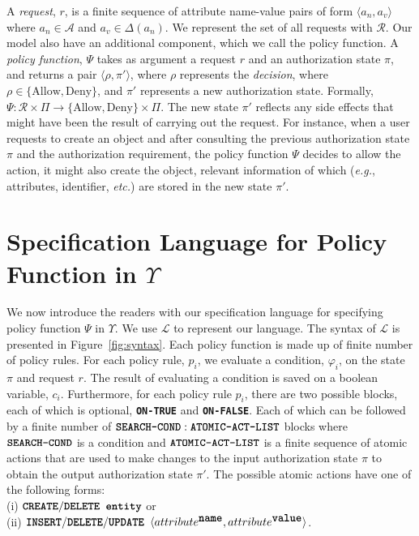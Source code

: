 \documentclass{sig-alternate}
\newcommand{\eg}{\textit{e.g.}\xspace}
\newcommand{\etc}{\textit{etc.}\xspace}
\newcommand{\state}{\ensuremath{\pi}\xspace}
\newcommand{\stateset}{\ensuremath{\Pi}\xspace}
\newcommand{\policyfunc}{\ensuremath{\Psi}\xspace}
\newcommand{\cR}{\ensuremath{\mathcal{R}}\xspace}
\newcommand{\cA}{\ensuremath{\mathcal{A}}\xspace}
\newcommand{\funcname}[1]{\textbf{\texttt{#1}}}
\newcommand{\dom}{\ensuremath{\Delta}\xspace} %
\newcommand{\Allow}{\ensuremath{\mbox{Allow}}\xspace}
\newcommand{\Deny}{\ensuremath{\mbox{Deny}}\xspace}
\newcommand{\abac}{\ensuremath{\Upsilon}\xspace}
\newcommand{\policy}{\ensuremath{\varphi}\xspace}
\newcommand{\cL}{\ensuremath{\mathcal{L}}\xspace}
\begin{document}
A \emph{request}, $r$, is a finite sequence of attribute name-value pairs of form $\langle a_n, a_v\rangle$ 
where $a_n\in\cA$ and $a_v\in\dom(a_n)$. We represent the set of all requests with \cR. 
Our model also have an additional component, which we call the policy function. A \emph{policy function}, \policyfunc takes 
as argument a request $r$ and an authorization state \state, and returns a pair $\langle \rho, \state'\rangle$, where $\rho$ represents the \emph{decision}, 
where $\rho \in \{\Allow, \Deny\}$, and $\state'$ represents a new authorization state. 
Formally, $\policyfunc : \cR \times \stateset \rightarrow \{\Allow, \Deny\} \times \stateset$. 
The new state $\state'$ reflects any side effects that might have been the result of carrying out the request. For instance, 
when a user requests to create an object and after consulting the previous authorization state \state and the authorization requirement, 
the policy function \policyfunc 
decides to allow the action, it might also create the object, relevant information of which (\eg, attributes, identifier, \etc) 
are stored in the new state $\state'$. 

\section{Specification Language for Policy Function in \abac} 
\label{sec:spec}
We now introduce the readers with our specification language for specifying policy function \policyfunc in \abac. 
We use \cL to represent our language. 
The syntax of \cL is presented in Figure~\ref{fig:syntax}. 
Each policy function is made up of finite number of policy rules. 
For each policy rule, $p_i$, we evaluate a condition, $\policy_i$, on the state \state and request $r$. 
The result of evaluating a condition is saved on a boolean variable, $c_i$.  
Furthermore, for each policy rule $p_i$, there are two possible blocks, each of which 
is optional, \funcname{ON-TRUE} and \funcname{ON-FALSE}. Each of which can be followed 
by a finite number of $\funcname{SEARCH-COND}: \funcname{ATOMIC-ACT-LIST}$ blocks  
where $\funcname{SEARCH-COND}$ is a condition 
and $\funcname{ATOMIC-ACT-LIST}$ 
is a finite sequence of atomic actions that are used to make changes to the input authorization state $\state$ to 
obtain the output authorization state $\state'$. The possible atomic actions have one of the following forms:\\ 
 \noindent(i) $\funcname{CREATE}/\funcname{DELETE  } \funcname{entity}$ or\\ 
\noindent(ii) $\funcname{INSERT}/\funcname{DELETE}/\funcname{UPDATE } 
\langle\funcname{$attribute^{\mbox{\texttt{name}}}$}, \funcname{$attribute^{\mbox{\texttt{value}}}$}\rangle$. 
\end{document}
